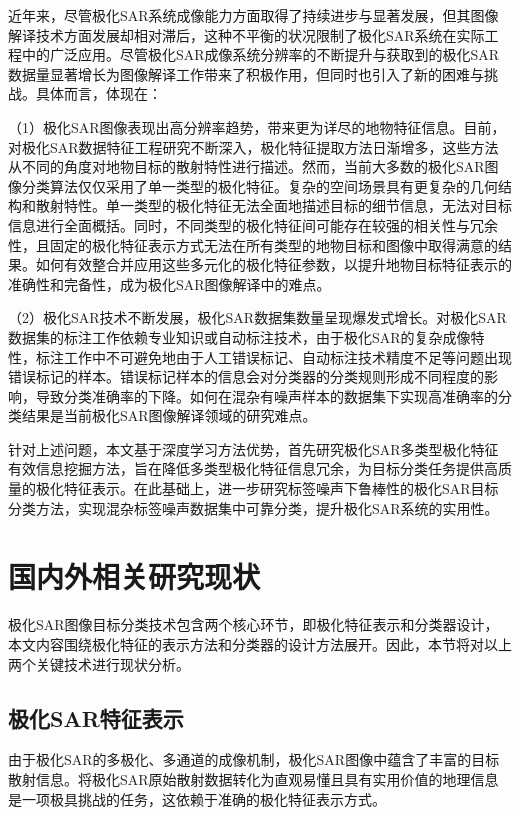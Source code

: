 近年来，尽管极化SAR系统成像能力方面取得了持续进步与显著发展，但其图像解译技术方面发展却相对滞后，这种不平衡的状况限制了极化SAR系统在实际工程中的广泛应用。尽管极化SAR成像系统分辨率的不断提升与获取到的极化SAR数据量显著增长为图像解译工作带来了积极作用，但同时也引入了新的困难与挑战。具体而言，体现在：

（1）极化SAR图像表现出高分辨率趋势，带来更为详尽的地物特征信息。目前，对极化SAR数据特征工程研究不断深入，极化特征提取方法日渐增多，这些方法从不同的角度对地物目标的散射特性进行描述。然而，当前大多数的极化SAR图像分类算法仅仅采用了单一类型的极化特征。复杂的空间场景具有更复杂的几何结构和散射特性。单一类型的极化特征无法全面地描述目标的细节信息，无法对目标信息进行全面概括。同时，不同类型的极化特征间可能存在较强的相关性与冗余性，且固定的极化特征表示方式无法在所有类型的地物目标和图像中取得满意的结果。如何有效整合并应用这些多元化的极化特征参数，以提升地物目标特征表示的准确性和完备性，成为极化SAR图像解译中的难点。

（2）极化SAR技术不断发展，极化SAR数据集数量呈现爆发式增长。对极化SAR数据集的标注工作依赖专业知识或自动标注技术，由于极化SAR的复杂成像特性，标注工作中不可避免地由于人工错误标记、自动标注技术精度不足等问题出现错误标记的样本。错误标记样本的信息会对分类器的分类规则形成不同程度的影响，导致分类准确率的下降。如何在混杂有噪声样本的数据集下实现高准确率的分类结果是当前极化SAR图像解译领域的研究难点。

针对上述问题，本文基于深度学习方法优势，首先研究极化SAR多类型极化特征有效信息挖掘方法，旨在降低多类型极化特征信息冗余，为目标分类任务提供高质量的极化特征表示。在此基础上，进一步研究标签噪声下鲁棒性的极化SAR目标分类方法，实现混杂标签噪声数据集中可靠分类，提升极化SAR系统的实用性。

\section{国内外相关研究现状}
极化SAR图像目标分类技术包含两个核心环节，即极化特征表示和分类器设计，本文内容围绕极化特征的表示方法和分类器的设计方法展开。因此，本节将对以上两个关键技术进行现状分析。

\subsection{极化SAR特征表示}
由于极化SAR的多极化、多通道的成像机制，极化SAR图像中蕴含了丰富的目标散射信息。将极化SAR原始散射数据转化为直观易懂且具有实用价值的地理信息是一项极具挑战的任务，这依赖于准确的极化特征表示方式。

